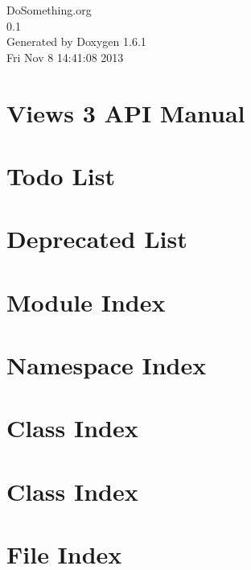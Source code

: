 \documentclass[a4paper]{book}
\begin{document}
\hypersetup{pageanchor=false}
\begin{titlepage}
\vspace*{7cm}
\begin{center}
{\Large DoSomething.org \\[1ex]\large 0.1 }\\
\vspace*{1cm}
{\large Generated by Doxygen 1.6.1}\\
\vspace*{0.5cm}
{\small Fri Nov 8 14:41:08 2013}\\
\end{center}
\end{titlepage}
\clearemptydoublepage
{}
\tableofcontents
\clearemptydoublepage
{}
\hypersetup{pageanchor=true}
\chapter{Views 3 API Manual}
\label{index}\hypertarget{index}{}
\chapter{Todo List}
\label{todo}
\hypertarget{todo}{}

\chapter{Deprecated List}
\label{deprecated}
\hypertarget{deprecated}{}

\chapter{Module Index}

\chapter{Namespace Index}

\chapter{Class Index}

\chapter{Class Index}

\chapter{File Index}

\end{document}

